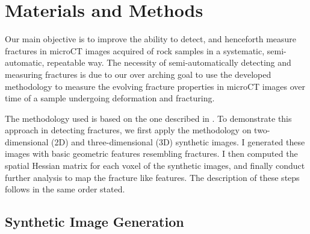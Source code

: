 \documentclass{edger}
\begin{document}
\section{Materials and Methods}
	Our main objective is to improve the ability to detect, and henceforth measure fractures in microCT images acquired of rock samples in a systematic, semi-automatic, repeatable way. The necessity of semi-automatically detecting and measuring fractures is due to our over arching goal to use the developed methodology to measure the evolving fracture properties in microCT images over time of a sample undergoing deformation and fracturing.  
	
	The methodology used is based on the one described in \cite{Voorn2013}. To demonstrate this approach in detecting fractures, we first apply the methodology on two-dimensional (2D) and three-dimensional (3D) synthetic images. I generated these images with basic geometric features resembling fractures. I then computed the spatial Hessian matrix for each voxel of the synthetic images, and finally conduct further analysis to map the fracture like features. The description of these steps follows in the same order stated. 

\subsection{Synthetic Image Generation} \label{sec:Synthetic Fractures}
\end{document}
